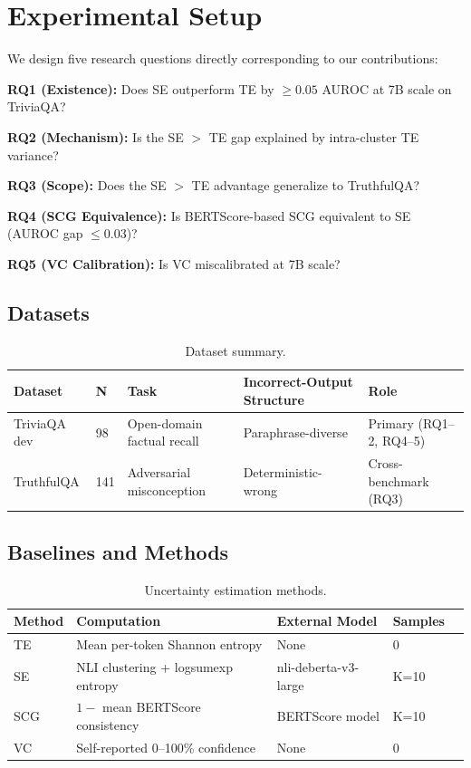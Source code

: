 \section{Experimental Setup}
\label{sec:setup}

We design five research questions directly corresponding to our contributions:

\textbf{RQ1 (Existence):} Does SE outperform TE by $\geq 0.05$ AUROC at 7B scale on TriviaQA?

\textbf{RQ2 (Mechanism):} Is the SE $>$ TE gap explained by intra-cluster TE variance?

\textbf{RQ3 (Scope):} Does the SE $>$ TE advantage generalize to TruthfulQA?

\textbf{RQ4 (SCG Equivalence):} Is BERTScore-based SCG equivalent to SE (AUROC gap $\leq 0.03$)?

\textbf{RQ5 (VC Calibration):} Is VC miscalibrated at 7B scale?

\subsection{Datasets}

\begin{table}[h]
\caption{Dataset summary.}
\label{tab:datasets}
\centering
\small
\begin{tabular}{lllll}
\toprule
Dataset & N & Task & Incorrect-Output Structure & Role \\
\midrule
TriviaQA dev & 98 & Open-domain factual recall & Paraphrase-diverse & Primary (RQ1--2, RQ4--5) \\
TruthfulQA & 141 & Adversarial misconception & Deterministic-wrong & Cross-benchmark (RQ3) \\
\bottomrule
\end{tabular}
\end{table}

\subsection{Baselines and Methods}

\begin{table}[h]
\caption{Uncertainty estimation methods.}
\label{tab:methods}
\centering
\small
\begin{tabular}{lllll}
\toprule
Method & Computation & External Model & Samples \\
\midrule
TE & Mean per-token Shannon entropy & None & 0 \\
SE & NLI clustering + logsumexp entropy & nli-deberta-v3-large & K=10 \\
SCG & $1 -$ mean BERTScore consistency & BERTScore model & K=10 \\
VC & Self-reported 0--100\% confidence & None & 0 \\
\bottomrule
\end{tabular}
\end{table}


